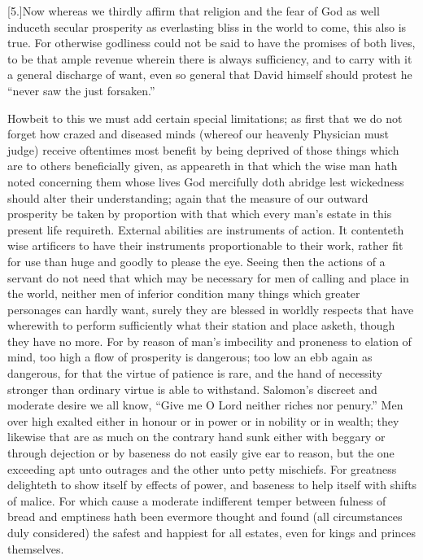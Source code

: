 [5.]Now whereas we thirdly affirm that religion and the fear of God as well induceth secular prosperity as everlasting bliss in the world to come, this also is true. For otherwise godliness could not be said to have the promises of both lives, to be that ample revenue wherein there is always sufficiency, and to carry with it a general discharge of want, even so general that David himself should protest he “never saw the just forsaken.”

Howbeit to this we must add certain special limitations; as first that we do not forget how crazed and diseased minds (whereof our heavenly Physician must judge) receive oftentimes  most benefit by being deprived of those things which are to others beneficially given, as appeareth in that which the wise man hath noted concerning them whose lives God mercifully doth abridge lest wickedness should alter their understanding; again that the measure of our outward prosperity be taken by proportion with that which every man’s estate in this present life requireth. External abilities are instruments of action. It contenteth wise artificers to have their instruments proportionable to their work, rather fit for use than huge and goodly to please the eye. Seeing then the actions of a servant do not need that which may be necessary for men of calling and place in the world, neither men of inferior condition many things which greater personages can hardly want, surely they are blessed in worldly respects that have wherewith to perform sufficiently what their station and place asketh, though they have no more. For by reason of man’s imbecility and proneness to elation of mind, too high a flow of prosperity is dangerous; too low an ebb again as dangerous, for that the virtue of patience is rare, and the hand of necessity stronger than ordinary virtue is able to withstand. Salomon’s discreet and moderate desire we all know, “Give me O Lord neither riches nor penury.” Men over high exalted either in honour or in power or in nobility or in wealth; they likewise that are as much on the contrary hand sunk either with beggary or through dejection or by baseness do not easily give ear to reason, but the one exceeding apt unto outrages and the other unto petty mischiefs. For greatness delighteth to show itself by effects of power, and baseness to help itself with shifts of malice. For which cause a moderate indifferent temper between fulness of bread and emptiness hath been evermore thought and found (all  circumstances duly considered) the safest and happiest for all estates,
 even for kings and princes themselves.

